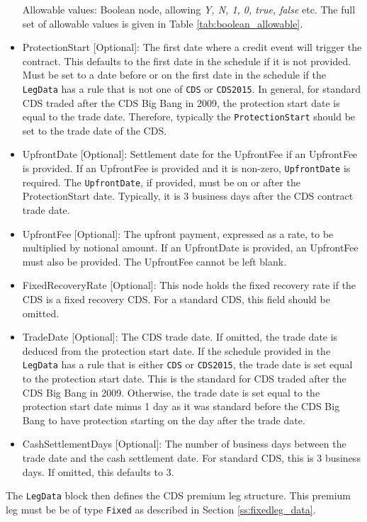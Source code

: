 \begin{itemize}
Allowable values: Boolean node, allowing \emph{Y, N, 1, 0, true, false} etc. The full set of allowable values is given in Table \ref{tab:boolean_allowable}.
  
\item ProtectionStart [Optional]: The first date where a credit event will trigger the contract. This defaults to the first date in the schedule if it is not provided. Must be set to a date before or on the first date in the schedule if the \lstinline!LegData! has a rule that is not one of \lstinline!CDS! or \lstinline!CDS2015!. In general, for standard CDS traded after the CDS Big Bang in 2009, the protection start date is equal to the trade date. Therefore, typically the \lstinline!ProtectionStart! should be set to the trade date of the CDS.
\item UpfrontDate [Optional]: Settlement date for the UpfrontFee if an UpfrontFee is provided. If an UpfrontFee is provided and it is non-zero, \lstinline!UpfrontDate! is required. The \lstinline!UpfrontDate!, if provided, must be on or after the ProtectionStart date. Typically, it is 3 business days after the CDS contract trade date.
\item UpfrontFee [Optional]: The upfront payment, expressed as a rate, to be multiplied by notional amount. If an UpfrontDate is provided, an UpfrontFee must also be provided. The UpfrontFee cannot be left blank.
\item FixedRecoveryRate [Optional]: This node holds the fixed recovery rate if the CDS is a fixed recovery CDS. For a standard CDS, this field should be omitted.
\item TradeDate [Optional]: The CDS trade date. If omitted, the trade date is deduced from the protection start date. If the schedule provided in the \lstinline!LegData! has a rule that is either \lstinline!CDS! or \lstinline!CDS2015!, the trade date is set equal to the protection start date. This is the standard for CDS traded after the CDS Big Bang in 2009. Otherwise, the trade date is set equal to the protection start date minus 1 day as it was standard before the CDS Big Bang to have protection starting on the day after the trade date.
\item CashSettlementDays [Optional]: The number of business days between the trade date and the cash settlement date. For standard CDS, this is 3 business days. If omitted, this defaults to 3.
\end{itemize}

The \lstinline!LegData! block then defines the CDS premium leg structure. This premium leg must be be of type \lstinline!Fixed! as described in Section \ref{ss:fixedleg_data}.

